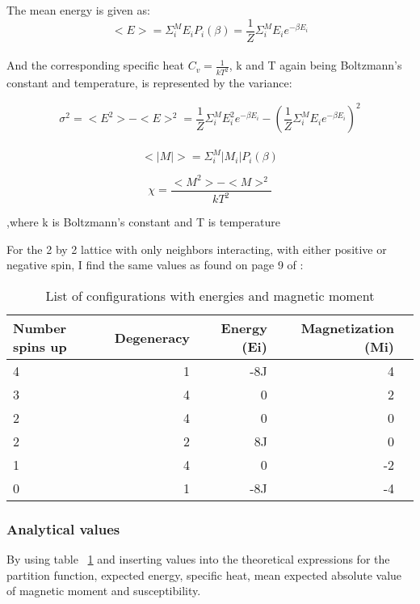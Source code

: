 The mean energy is given as:
\begin{equation}
<E> = \Sigma_i^ME_iP_i(\beta) = \frac{1}{Z}\Sigma_i^ME_ie^{-\beta E_i}
\end{equation}\\


And the corresponding specific heat $C_v=\frac{1}{kT^2}$, k and T again being Boltzmann's constant and temperature, is represented by the variance:

\begin{equation}
\sigma^2 = <E^2> - <E>^2 = \frac{1}{Z}\Sigma_i^ME_i^2e^{-\beta E_i}-(\frac{1}{Z}\Sigma_i^ME_ie^{-\beta E_i})^2
\end{equation}\\

\begin{equation}
<|M|> = \Sigma_i^M|M_i|P_i(\beta)
\end{equation}


\begin{equation}
\chi = \frac{<M^2> - <M>^2}{kT^2}
\end{equation}

,where k is Boltzmann's constant and T is temperature

For the 2 by 2 lattice with only neighbors interacting, with either positive or negative spin, I find the same values as found on page 9 of \cite{isingstat}:


\FloatBarrier
\begin{table}

\begin{tabular}{lrrrr}
\toprule
Number spins up &  Degeneracy &  Energy (Ei) &  Magnetization (Mi) \\
\midrule
4 &      1 &      -8J &        4 \\
3 &      4 &      0 &        2 \\
2 &      4 &      0 &        0 \\
2 &      2 &      8J &        0 \\
1 &      4 &      0 &        -2 \\
0 &      1 &      -8J &        -4 \\
\bottomrule

\end{tabular}

\caption{List of configurations with energies and magnetic moment}
\label{tab:Configurations_energy_magnetic}
\end{table}
\FloatBarrier


\subsubsection{Analytical values}
By using table ~\ref{tab:Configurations_energy_magnetic} and inserting values into the theoretical expressions for the partition function, expected energy, specific heat, mean expected absolute value of magnetic moment and susceptibility.\\


